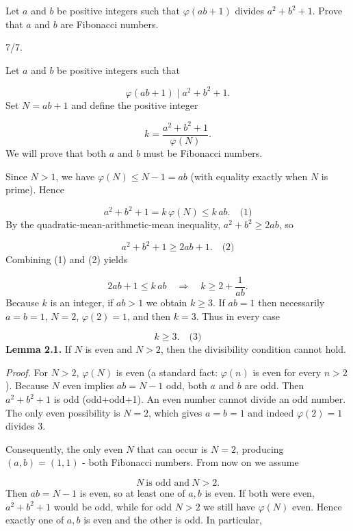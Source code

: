 \begin{mdframed}[style=mdpurplebox,frametitle={USAMO 2026 Problem 6}]
Let $a$ and $b$ be positive integers such that $\varphi(ab+1)$ divides $a^2 + b^2 + 1$. Prove that $a$ and $b$ are Fibonacci numbers.
\end{mdframed}
\begin{remark*}
  7/7.
\end{remark*}
Let \(a\) and \(b\) be positive integers such that\par
\[
\varphi(ab+1) \mid a^{2}+b^{2}+1.
\]
Set \(N = ab+1\) and define the positive integer\par
\[
k = \frac{a^{2}+b^{2}+1}{\varphi(N)}.
\]
We will prove that both \(a\) and \(b\) must be Fibonacci numbers.\par
\smallskip
{}
Since \(N > 1\), we have \(\varphi(N) \le N-1 = ab\) (with equality exactly when \(N\) is prime). Hence\par
\[
a^{2}+b^{2}+1 = k\,\varphi(N) \le k\,ab. \quad\text{(1)}
\]
By the quadratic-mean-arithmetic-mean inequality, \(a^{2}+b^{2} \ge 2ab\), so\par
\[
a^{2}+b^{2}+1 \ge 2ab+1. \quad\text{(2)}
\]
Combining (1) and (2) yields\par
\[
2ab+1 \le k\,ab \quad\Longrightarrow\quad k \ge 2 + \frac{1}{ab}.
\]
Because \(k\) is an integer, if \(ab > 1\) we obtain \(k \ge 3\). If \(ab = 1\) then necessarily \(a=b=1\), \(N=2\), \(\varphi(2)=1\), and then \(k = 3\). Thus in every case\par
\[
\boxed{k \ge 3}. \quad\text{(3)}
\]
\smallskip
{}
\textbf{Lemma 2.1.} If \(N\) is even and \(N>2\), then the divisibility condition cannot hold.\par
\emph{Proof.} For \(N>2\), \(\varphi(N)\) is even (a standard fact: \(\varphi(n)\) is even for every \(n>2\)). Because \(N\) even implies \(ab = N-1\) odd, both \(a\) and \(b\) are odd. Then \(a^{2}+b^{2}+1\) is odd (odd+odd+1). An even number cannot divide an odd number. The only even possibility is \(N=2\), which gives \(a=b=1\) and indeed \(\varphi(2)=1\) divides \(3\).\par
Consequently, the only even \(N\) that can occur is \(N=2\), producing \((a,b)=(1,1)\) - both Fibonacci numbers. From now on we assume\par
\[
N\ \text{is odd and}\ N>2.
\]
Then \(ab = N-1\) is even, so at least one of \(a,b\) is even. If both were even, \(a^{2}+b^{2}+1\) would be odd, while for odd \(N>2\) we still have \(\varphi(N)\) even. Hence exactly one of \(a,b\) is even and the other is odd. In particular,\par
